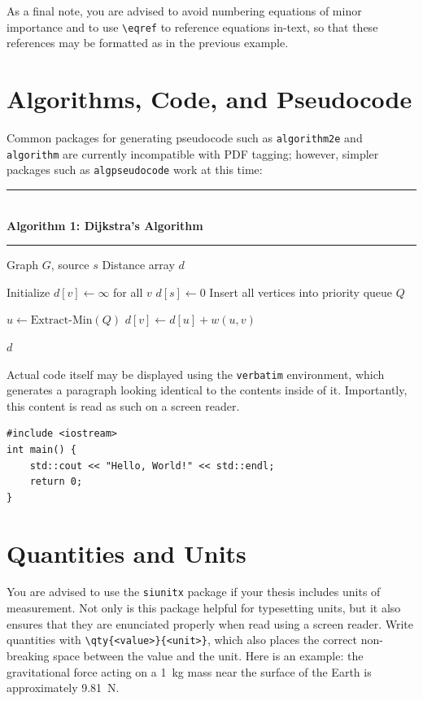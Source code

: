 As a final note, you are advised to avoid numbering equations of minor importance and to use \verb|\eqref| to reference equations in-text, so that these references may be formatted as in the previous example.

\section{Algorithms, Code, and Pseudocode}
Common packages for generating pseudocode such as \texttt{algorithm2e} and \texttt{algorithm} are currently incompatible with PDF tagging; however, simpler packages such as \texttt{algpseudocode} work at this time:

\noindent
\rule{\textwidth}{0.4pt}\\[-3pt]
\textbf{Algorithm 1: Dijkstra's Algorithm}\\[-5pt]
\rule{\textwidth}{0.4pt}

\begin{algorithmic}[1]
  \Require Graph \(G\), source \(s\)
  \Ensure Distance array \(d\)

  \State Initialize \(d[v] \gets \infty\) for all \(v\)
  \State \(d[s] \gets 0\)
  \State Insert all vertices into priority queue \(Q\)

  \State \(u \gets \text{Extract-Min}(Q)\)
  \State \(d[v] \gets d[u] + w(u,v)\)
  \EndIf
  \EndFor
  \EndWhile

  \State \Return \(d\)
\end{algorithmic}
%
Actual code itself may be displayed using the \texttt{verbatim} environment, which generates a paragraph looking identical to the contents inside of it.
Importantly, this content is read as such on a screen reader.
\begin{verbatim}
#include <iostream>
int main() {
    std::cout << "Hello, World!" << std::endl;
    return 0;
}
\end{verbatim}

\section{Quantities and Units}
You are advised to use the \texttt{siunitx} package if your thesis includes units of measurement.
Not only is this package helpful for typesetting units, but it also ensures that they are enunciated properly when read using a screen reader.
Write quantities with \verb|\qty{<value>}{<unit>}|, which also places the correct non-breaking space between the value and the unit.
Here is an example: the gravitational force acting on a \qty{1}{\kilo\gram} mass near the surface of the Earth is approximately \qty{9.81}{\newton}.

